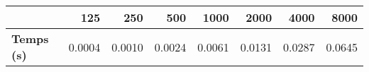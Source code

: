 \begin{tabular}{lrrrrrrr}
\toprule
{} &   125  &   250  &   500  &   1000 &   2000 &   4000 &   8000 \\
\midrule
\textbf{Temps (s)} & 0.0004 & 0.0010 & 0.0024 & 0.0061 & 0.0131 & 0.0287 & 0.0645 \\
\bottomrule
\end{tabular}

